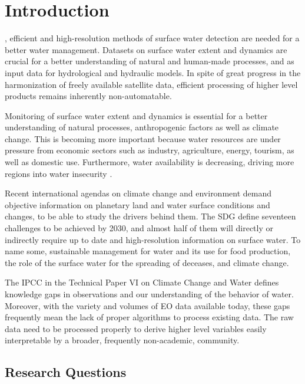 \chapter{Introduction}

\label{intro}

, efficient and high-resolution methods of surface water detection are needed for a better water management. Datasets on surface water extent and dynamics are crucial for a better understanding of natural and human-made processes, and as input data for hydrological and hydraulic models. In spite of great progress in the harmonization of freely available satellite data, efficient processing of higher level products remains inherently non-automatable.

Monitoring of surface water extent and dynamics is essential for a better understanding of natural processes, anthropogenic factors as well as climate change. This is becoming more important because water resources are under pressure from economic sectors such as industry, agriculture, energy, tourism, as well as domestic use. Furthermore, water availability is decreasing,  driving more regions into water insecurity \citet{unfao2006watermonitoring, McDonald12042011}.

Recent international agendas on climate change and environment demand objective information on planetary land and water surface conditions and changes, to be able to study the drivers behind them. The \gls{SDG} \citet{un2015resolution} define seventeen challenges to be achieved by 2030, and almost half of them will directly or indirectly require up to date and high-resolution information on surface water. To name some, sustainable management for water and its use for food production, the role of the surface water for the spreading of deceases, and climate change. 

The \gls{IPCC} in the Technical Paper VI on Climate Change and Water defines knowledge gaps in observations and our understanding of the behavior of water. Moreover, with the variety and volumes of \gls{EO} data available today, these gaps frequently mean the lack of proper algorithms to process existing data. The raw data need to be processed properly to derive higher level variables easily interpretable by a broader, frequently non-academic, community. 

\section{Research Questions}

